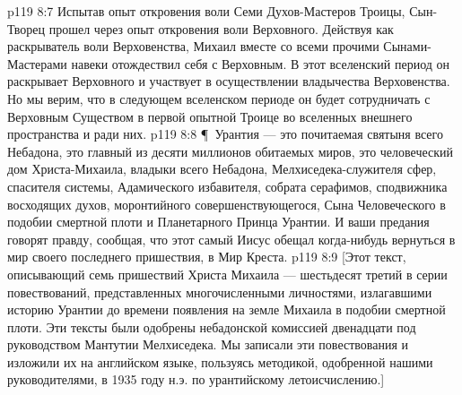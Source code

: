 \vs p119 8:7 Испытав опыт откровения воли Семи Духов\hyp{}Мастеров Троицы, Сын\hyp{}Творец прошел через опыт откровения воли Верховного. Действуя как раскрыватель воли Верховенства, Михаил вместе со всеми прочими Сынами\hyp{}Мастерами навеки отождествил себя с Верховным. В этот вселенский период он раскрывает Верховного и участвует в осуществлении владычества Верховенства. Но мы верим, что в следующем вселенском периоде он будет сотрудничать с Верховным Существом в первой опытной Троице во вселенных внешнего пространства и ради них.
\vs p119 8:8 \P\ Урантия --- это почитаемая святыня всего Небадона, это главный из десяти миллионов обитаемых миров, это человеческий дом Христа\hyp{}Михаила, владыки всего Небадона, Мелхиседека\hyp{}служителя сфер, спасителя системы, Адамического избавителя, собрата серафимов, сподвижника восходящих духов, моронтийного совершенствующегося, Сына Человеческого в подобии смертной плоти и Планетарного Принца Урантии. И ваши предания говорят правду, сообщая, что этот самый Иисус обещал когда\hyp{}нибудь вернуться в мир своего последнего пришествия, в Мир Креста.
\separatorline
\vs p119 8:9 [Этот текст, описывающий семь пришествий Христа Михаила --- шестьдесят третий в серии повествований, представленных многочисленными личностями, излагавшими историю Урантии до времени появления на земле Михаила в подобии смертной плоти. Эти тексты были одобрены небадонской комиссией двенадцати под руководством Мантутии Мелхиседека. Мы записали эти повествования и изложили их на английском языке, пользуясь методикой, одобренной нашими руководителями, в 1935 году н.э. по урантийскому летоисчислению.]
